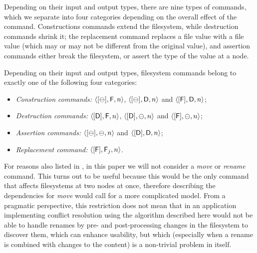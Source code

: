 \myskip
Depending on their input and output types, there are nine types of commands,
which we separate into four categories depending on the overall effect of the command.
Constructions commands extend the filesystem,
while destruction commands shrink it;
the replacement command replaces a file value with a file value
(which may or may not be different from the original value),
and assertion commands either break the filesystem, or assert the type of the value at a node.
\begin{mydef}
Depending on their input and output types, filesystem commands
belong to exactly one of the following four categories:
\begin{itemize}
\item[]\emph{Construction commands:}
    $\langle{[\ominus],\mathsf{F},n}\rangle$, $\langle{[\ominus],\mathsf{D},n}\rangle$ and $\langle{[\mathsf{F}],\mathsf{D},n}\rangle$;
\item[]\emph{Destruction commands:}
    $\langle{[\mathsf{D}],\mathsf{F},n}\rangle$, $\langle{[\mathsf{D}],\ominus,n}\rangle$ and $\langle{[\mathsf{F}],\ominus,n}\rangle$;
\item[]\emph{Assertion commands:}
    $\langle{[\ominus],\ominus,n}\rangle$ and $\langle{[\mathsf{D}],\mathsf{D},n}\rangle$;
\item[]\emph{Replacement command:}
    $\langle{[\mathsf{F}],\mathsf{F}_j,n}\rangle$.
\qedhere
\end{itemize}
\end{mydef}



\myskip
For reasons also listed in \cite{NREC}, in this paper we will not consider
a \textit{move} or \textit{rename} command.
This turns out to be useful because this would be the only command that affects
filesystems at two nodes at once, therefore describing 
the dependencies for \textit{move} would call for a more complicated model.
From a pragmatic perspective, this restriction does not mean that in an application
implementing conflict resolution using the algorithm described here would not be
able to handle renames by pre- and post-processing changes in the filesystem to
discover them, which can enhance usability, but which
(especially when a rename is combined with changes to the content)
is a non-trivial problem in itself.
